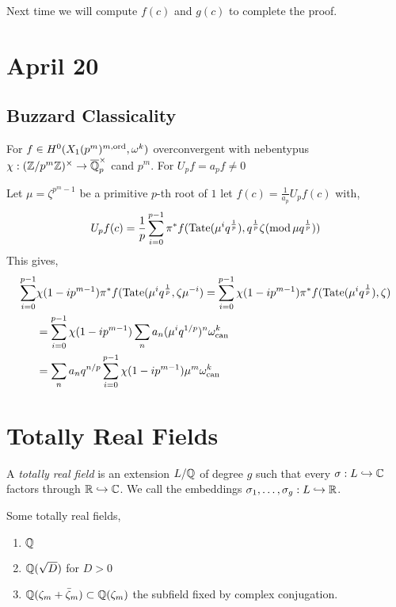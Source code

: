 \documentclass[12pt]{article}
\begin{document}
\begin{rmk}
Next time we will compute $f(c)$ and $g(c)$ to complete the proof. 
\end{rmk}

\section{April 20}

\subsection{Buzzard Classicality}

For $f \in H^0(X_1(p^m)^{m,\operatorname{\mathrm{ord}}}, \omega^k)$ overconvergent with nebentypus $\chi : (\mathbb{Z} / p^m \mathbb{Z})^\times \to \overline{\mathbb{Q}}_p^\times$ cand $p^m$. For $U_p f = a_p f \neq 0$ 




Let $\mu = \zeta^{p^m - 1}$ be a primitive $p$-th root of $1$ let $f(c) = \frac{1}{a_p} U_p f(c)$ with,
\[ U_p f(c) = \frac{1}{p} \sum_{i = 0}^{p-1} \pi^* f(\mathrm{Tate}(\mu^i q^{\frac{1}{p}}), q^{\frac{1}{p}} \zeta (\text{mod} \, \mu q^{\frac{1}{p}})) \]
This gives,
\begin{align*}
\sum_{i = 0}^{p-1} & \chi(1 - i p^{m-1}) \pi^* f(\mathrm{Tate}(\mu^i q^{\frac{1}{p}}, \zeta \mu^{-i}) = \sum_{i = 0}^{p-1} \chi(1 - i p^{m-1}) \pi^* f(\mathrm{Tate}(\mu^i q^{\frac{1}{p}}), \zeta)
\\
& = \sum_{i = 0}^{p-1} \chi(1 - i p^{m-1}) \sum_n a_n(\mu^i q^{1/p})^n \omega_{\mathrm{can}}^k
\\
& = \sum_n a_n q^{n/p} \sum_{i = 0}^{p-1} \chi(1 - i p^{m-1}) \mu^m \omega_{\mathrm{can}}^k 
\end{align*}

\section{Totally Real Fields}

\begin{defn}
A \textit{totally real field} is an extension $L / \mathbb{Q}$ of degree $g$ such that every $\sigma : L \hookrightarrow \mathbb{C}$ factors through $\mathbb{R} \hookrightarrow \mathbb{C}$. We call the embeddings $\sigma_1, \dots, \sigma_g : L \hookrightarrow \mathbb{R}$.
\end{defn}

\begin{example}
Some totally real fields,
\begin{enumerate}
\item $\mathbb{Q}$
\item $\mathbb{Q}(\sqrt{D})$ for $D > 0$
\item $\mathbb{Q}(\zeta_m + \bar{\zeta}_m) \subset \mathbb{Q}(\zeta_m)$ the subfield fixed by complex conjugation.
\end{enumerate}
\end{example}
\end{document}
